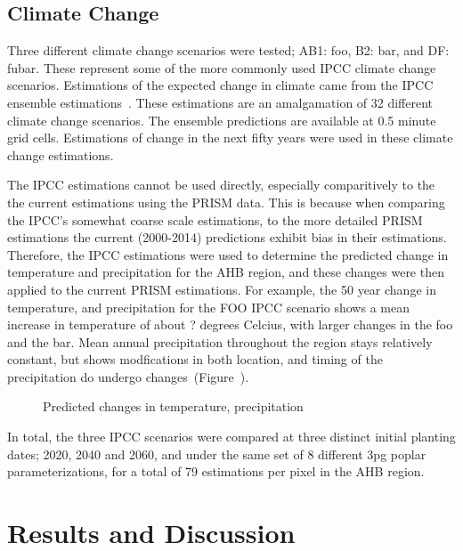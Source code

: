 \documentclass[preprint,12pt]{elsarticle}
\begin{document}
\subsection{Climate Change}
\label{sec:climate}

Three different climate change scenarios were tested; AB1: foo, B2:
bar, and DF: fubar.  These represent some of the more commonly used
IPCC climate change scenarios.  Estimations of the expected change in
climate came from the IPCC ensemble estimations~\cite{ipcc-ensemble}.
These estimations are an amalgamation of 32 different climate change
scenarios.  The ensemble predictions are available at 0.5 minute grid
cells.  Estimations of change in the next fifty years were used in
these climate change estimations.

The \ac{IPCC} estimations cannot be used directly, especially
comparitively to the the current estimations using the \ac{PRISM}
data.  This is because when comparing the \ac{IPCC}'s somewhat coarse
scale estimations, to the more detailed \ac{PRISM} estimations the
current (2000-2014) predictions exhibit bias in their estimations.
Therefore, the \ac{IPCC} estimations were used to determine the
predicted change in temperature and precipitation for the \ac {AHB}
region, and these changes were then applied to the current \ac{PRISM}
estimations. For example, the 50 year change in temperature, and
precipitation for the \ac{FOO} \ac{IPCC} scenario shows a mean
increase in temperature of about ? degrees Celcius, with larger
changes in the foo and the bar.  Mean annual precipitation throughout
the region stays relatively constant, but shows modfications in both
location, and timing of the precipitation do undergo
changes~(Figure~\cite{fig:new-temp}).

\begin{figure}[hp]
  \centering
  
  \caption{Predicted changes in temperature, precipitation }
  \label{fig:new-temp}
\end{figure}

In total, the three \ac{IPCC} scenarios were compared at three
distinct initial planting dates; 2020, 2040 and 2060, and under the
same set of 8 different \ac{3pg} poplar parameterizations, for a total
of 79 estimations per pixel in the \ac{AHB} region.  

\section{Results and Discussion}
\end{document}

